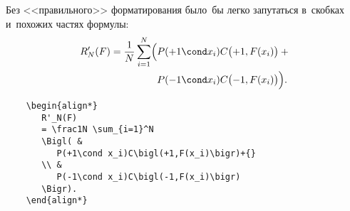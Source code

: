 \begin{Example}
\label{exExample}
    Без <<правильного>> форматирования
    было~бы легко запутаться в~скобках и~похожих частях формулы:
    \begin{align*}
    R'_N(F)
        = \frac1N \sum_{i=1}^N
        \Bigl(&
            P(+1\cond x_i) C\bigl(+1,F(x_i)\bigr)+{}
        \\&
            P(-1\cond x_i) C\bigl(-1,F(x_i)\bigr)
        \Bigr).
    \end{align*}
\end{Example}
\begin{verbatim}
    \begin{align*}
       R'_N(F)
       = \frac1N \sum_{i=1}^N
       \Bigl( &
          P(+1\cond x_i)C\bigl(+1,F(x_i)\bigr)+{}
       \\ &
          P(-1\cond x_i)C\bigl(-1,F(x_i)\bigr)
       \Bigr).
    \end{align*}
\end{verbatim}